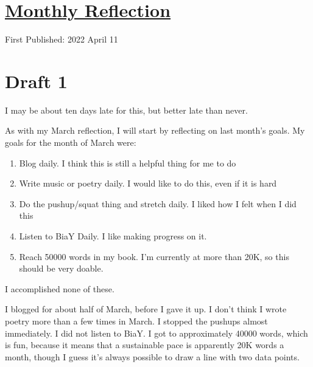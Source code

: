 \documentclass[12pt]{article}[titlepage]
\renewcommand{\,}{\textsuperscript{,}}
\begin{document}
\doublespacing
\section{\href{reflection-march-22.html}{Monthly Reflection}}
First Published: 2022 April 11

\section{Draft 1}
I may be about ten days late for this, but better late than never.

As with my March reflection, I will start by reflecting on last month's goals.
My goals for the month of March were:
\begin{enumerate}
\item Blog daily. I think this is still a helpful thing for me to do
\item Write music or poetry daily. I would like to do this, even if it is hard
\item Do the pushup/squat thing and stretch daily. I liked how I felt when I did this
\item Listen to BiaY Daily. I like making progress on it.
\item Reach 50000 words in my book. I'm currently at more than 20K, so this should be very doable.
\end{enumerate}
I accomplished none of these.

I blogged for about half of March, before I gave it up.
I don't think I wrote poetry more than a few times in March.
I stopped the pushups almost immediately.
I did not listen to BiaY.
I got to approximately 40000 words, which is fun, because it means that a sustainable pace is apparently 20K words a month, though I guess it's always possible to draw a line with two data points.
\end{document}
